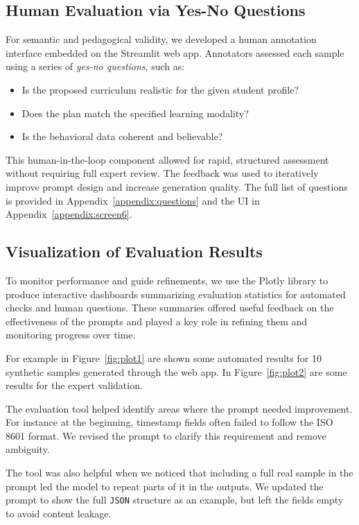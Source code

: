\subsection{Human Evaluation via Yes-No Questions}  
For semantic and pedagogical validity, we developed a human annotation interface embedded on the Streamlit web app. Annotators assessed each sample using a series of \textit{yes-no questions}, such as:
\begin{itemize}
    \item Is the proposed curriculum realistic for the given student profile?
    \item Does the plan match the specified learning modality?
    \item Is the behavioral data coherent and believable?
\end{itemize}

This human-in-the-loop component allowed for rapid, structured assessment without requiring full expert review. The feedback was used to iteratively improve prompt design and increase generation quality. The full list of questions is provided in Appendix~\ref{appendix:questions} and the UI in Appendix~\ref{appendix:screen6}.

\subsection{Visualization of Evaluation Results}
  
To monitor performance and guide refinements, we use the Plotly library to produce interactive dashboards summarizing evaluation statistics for automated checks and human questions.
These summaries offered useful feedback on the effectiveness of the prompts and played a key role in refining them and monitoring progress over time.

For example in Figure~\ref{fig:plot1} are shown some automated results for 10 synthetic samples generated through the web app. In Figure~\ref{fig:plot2} are some results for the expert validation.

The evaluation tool helped identify areas where the prompt needed improvement. For instance at the beginning, timestamp fields often failed to follow the ISO 8601 format. We revised the prompt to clarify this requirement and remove ambiguity.

The tool was also helpful when we noticed that including a full real sample in the prompt led the model to repeat parts of it in the outputs. We updated the prompt to show the full \texttt{JSON} structure as an example, but left the fields empty to avoid content leakage.

